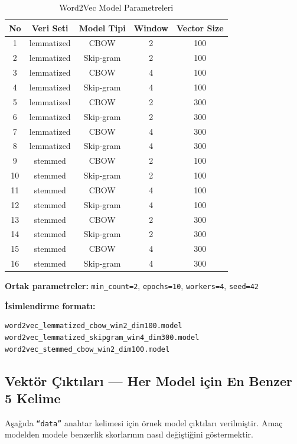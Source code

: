 \documentclass[12pt, a4paper]{article}
\begin{document}
\begin{table}[H]
\centering
\caption{Word2Vec Model Parametreleri}
\begin{tabular}{ccccc}
\toprule
\textbf{No} & \textbf{Veri Seti} & \textbf{Model Tipi} & \textbf{Window} & \textbf{Vector Size} \\
\midrule
1  & lemmatized & CBOW     & 2 & 100 \\
2  & lemmatized & Skip-gram & 2 & 100 \\
3  & lemmatized & CBOW     & 4 & 100 \\
4  & lemmatized & Skip-gram & 4 & 100 \\
5  & lemmatized & CBOW     & 2 & 300 \\
6  & lemmatized & Skip-gram & 2 & 300 \\
7  & lemmatized & CBOW     & 4 & 300 \\
8  & lemmatized & Skip-gram & 4 & 300 \\
\midrule
9  & stemmed & CBOW     & 2 & 100 \\
10 & stemmed & Skip-gram & 2 & 100 \\
11 & stemmed & CBOW     & 4 & 100 \\
12 & stemmed & Skip-gram & 4 & 100 \\
13 & stemmed & CBOW     & 2 & 300 \\
14 & stemmed & Skip-gram & 2 & 300 \\
15 & stemmed & CBOW     & 4 & 300 \\
16 & stemmed & Skip-gram & 4 & 300 \\
\bottomrule
\end{tabular}
\end{table}

\textbf{Ortak parametreler:} \texttt{min\_count=2}, \texttt{epochs=10}, \texttt{workers=4}, \texttt{seed=42}

\textbf{İsimlendirme formatı:}
\begin{lstlisting}[style=kod, language={}]
word2vec_lemmatized_cbow_win2_dim100.model
word2vec_lemmatized_skipgram_win4_dim300.model
word2vec_stemmed_cbow_win2_dim100.model
\end{lstlisting}

\subsection{Vektör Çıktıları — Her Model için En Benzer 5 Kelime}

Aşağıda \texttt{``data''} anahtar kelimesi için örnek model çıktıları verilmiştir. Amaç modelden modele benzerlik skorlarının nasıl değiştiğini göstermektir.
\end{document}
